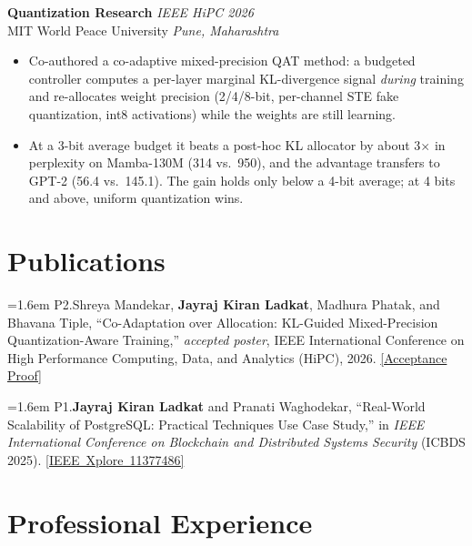 \documentclass[11pt,a4paper]{article}
\begin{document}
\textbf{Quantization Research} \hfill \textit{IEEE HiPC 2026}\\
MIT World Peace University \hfill \textit{Pune, Maharashtra}
\begin{itemize}
  \item Co-authored a co-adaptive mixed-precision QAT method: a budgeted
        controller computes a per-layer marginal KL-divergence signal
        \emph{during} training and re-allocates weight precision (2/4/8-bit,
        per-channel STE fake quantization, int8 activations) while the weights
        are still learning.
  \item At a 3-bit average budget it beats a post-hoc KL allocator by about 3$\times$
        in perplexity on Mamba-130M (314 vs.\ 950), and the advantage transfers
        to GPT-2 (56.4 vs.\ 145.1). The gain holds only below a 4-bit average;
        at 4 bits and above, uniform quantization wins.
\end{itemize}


\section{Publications}

\hangindent=1.6em
P2.\quad Shreya Mandekar, \textbf{Jayraj Kiran Ladkat}, Madhura Phatak,
and Bhavana Tiple,
``Co-Adaptation over Allocation: KL-Guided Mixed-Precision
Quantization-Aware Training,''
\textit{accepted poster},
IEEE International Conference on High Performance Computing,
Data, and Analytics (HiPC), 2026.
\href{https://drive.google.com/file/d/1wYned37BXW-kTc7B7jNQFcwUzh66sxkG/view?usp=sharing}{[\;Acceptance Proof]}

\vspace{0.45em}

\hangindent=1.6em
P1.\quad \textbf{Jayraj Kiran Ladkat} and Pranati Waghodekar,
``Real-World Scalability of PostgreSQL: Practical Techniques
Use Case Study,''
in \textit{IEEE International Conference on Blockchain and
Distributed Systems Security} (ICBDS 2025).
\href{https://ieeexplore.ieee.org/document/11377486/}{[\;IEEE~Xplore~11377486]}


\section{Professional Experience}
\end{document}
